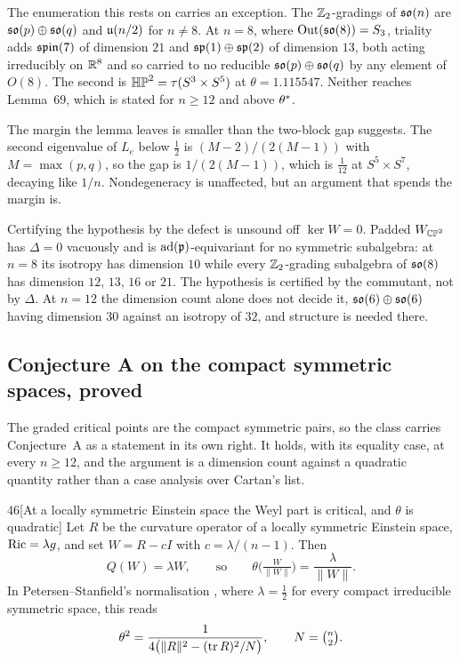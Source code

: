 The enumeration this rests on carries an exception. The $\mathbb{Z}_2$-gradings of $\mathfrak{so}(n)$ are $\mathfrak{so}(p)\oplus\mathfrak{so}(q)$ and $\mathfrak{u}(n/2)$ for $n\ne8$. At $n=8$, where $\mathrm{Out}(\mathfrak{so}(8))=S_3$, triality adds $\mathfrak{spin}(7)$ of dimension $21$ and $\mathfrak{sp}(1)\oplus\mathfrak{sp}(2)$ of dimension $13$, both acting irreducibly on $\mathbb{R}^8$ and so carried to no reducible $\mathfrak{so}(p)\oplus\mathfrak{so}(q)$ by any element of $O(8)$. The second is $\mathbb{HP}^2=\tau(S^3\times S^5)$ at $\theta=1.115547$. Neither reaches Lemma~69, which is stated for $n\ge12$ and above $\theta^{*}$.

The margin the lemma leaves is smaller than the two-block gap suggests. The second eigenvalue of $L_e$ below $\tfrac12$ is $(M-2)/(2(M-1))$ with $M=\max(p,q)$, so the gap is $1/(2(M-1))$, which is $\tfrac1{12}$ at $S^5\times S^7$, decaying like $1/n$. Nondegeneracy is unaffected, but an argument that spends the margin is.

\begin{remarkstar}
Certifying the hypothesis by the defect is unsound off $\ker W=0$. Padded $W_{\mathbb{CP}^2}$ has $\Delta=0$ vacuously and is $\mathrm{ad}(\mathfrak{p})$-equivariant for no symmetric subalgebra: at $n=8$ its isotropy has dimension $10$ while every $\mathbb{Z}_2$-grading subalgebra of $\mathfrak{so}(8)$ has dimension $12$, $13$, $16$ or $21$. The hypothesis is certified by the commutant, not by $\Delta$. At $n=12$ the dimension count alone does not decide it, $\mathfrak{so}(6)\oplus\mathfrak{so}(6)$ having dimension $30$ against an isotropy of $32$, and structure is needed there.
\end{remarkstar}

\subsection{Conjecture A on the compact symmetric spaces, proved}\label{sec:symmetric}

The graded critical points are the compact symmetric pairs, so the class carries Conjecture~A as a statement in its own right. It holds, with its equality case, at every $n\ge12$, and the argument is a dimension count against a quadratic quantity rather than a case analysis over Cartan's list.

\begin{Lem}{46}[At a locally symmetric Einstein space the Weyl part is critical, and $\theta$ is quadratic]
Let $R$ be the curvature operator of a locally symmetric Einstein space, $\mathrm{Ric}=\lambda g$, and set $W=R-cI$ with $c=\lambda/(n-1)$. Then
\[
Q(W)=\lambda W,\qquad\text{so}\qquad \theta\Big(\tfrac W{\|W\|}\Big)=\frac\lambda{\|W\|} .
\]
In Petersen--Stanfield's normalisation \cite{ps2025}, where $\lambda=\tfrac12$ for every compact irreducible symmetric space, this reads
\[
\theta^2=\frac1{4\big(\|R\|^2-(\operatorname{tr} R)^2/N\big)},\qquad N=\tbinom n2 .
\]
\end{Lem}

